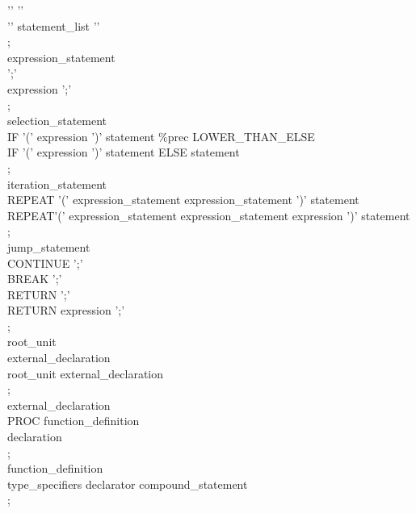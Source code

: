 \documentclass[11pt]{article}
\begin{document}
{\hspace*{1cm} '{' '}'\\
\hspace*{1cm}   '{' statement\_list '}'\\
\hspace*{1cm};\\
expression\_statement\\
\hspace*{1cm} ';'\\
\hspace*{1cm}   expression ';'\\
\hspace*{1cm};\\
selection\_statement\\
\hspace*{1cm} IF '(' expression ')' statement \%prec LOWER\_THAN\_ELSE \\
\hspace*{1cm}   IF '(' expression ')' statement ELSE statement\\
\hspace*{1cm};\\
iteration\_statement\\
\hspace*{1cm} REPEAT '(' expression\_statement expression\_statement ')' statement\\
\hspace*{1cm}   REPEAT'(' expression\_statement expression\_statement expression ')' statement\\
\hspace*{1cm};\\
jump\_statement\\
\hspace*{1cm} CONTINUE ';'\\
\hspace*{1cm}   BREAK ';'\\
\hspace*{1cm}   RETURN ';'\\
\hspace*{1cm}   RETURN expression ';'\\
\hspace*{1cm};\\
root\_unit\\
\hspace*{1cm} external\_declaration\\
\hspace*{1cm}   root\_unit external\_declaration\\
\hspace*{1cm};\\
external\_declaration\\
\hspace*{1cm} PROC function\_definition\\
\hspace*{1cm} declaration\\
\hspace*{1cm};\\
function\_definition\\
\hspace*{1cm} type\_specifiers declarator compound\_statement\\
\hspace*{1cm};\\
}
\end{document}
